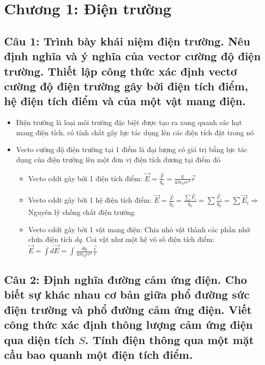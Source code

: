 \section[Chương 1]{Chương 1: Điện trường}

\subsection[Câu 1]{Câu 1: Trình bày khái niệm điện trường. Nêu định nghĩa và ý nghĩa của vector cường độ điện trường. Thiết lập công thức xác định vectơ cường độ điện trường gây bởi điện tích điểm, hệ điện tích điểm và của một vật mang điện.}

\begin{itemize}
  \item Điện trường là loại môi trường đặc biệt được tạo ra xung quanh các hạt mang điện tích, có tính chất gây lực tác dụng lên các điện tích đặt trong nó
  \item Vecto cường độ điện trường tại 1 điểm là đại lượng có giá trị bằng lực tác dụng của điện trường lên một đơn vị điện tích dương tại điểm đó
  \begin{itemize}
    \item Vecto cddt gây bởi 1 điện tích điểm: $\vec{E} = \frac{\vec{F}}{q_0} = \frac{q}{4\pi\epsilon_0\epsilon r^3} \vec{r}$
    \item Vecto cddt gây bởi 1 hệ điện tích điểm: $\vec{E} = \frac{\vec{F}}{q_0} = \frac{\sum\limits \vec{F}_i}{q_0} = \sum\limits \frac{\vec{F}_i}{q_0} = \sum\limits \vec{E}_i \Rightarrow$  Nguyên lý chồng chất điện trường
    \item Vecto cddt gây bởi 1 vật mang điện: Chia nhỏ vật thành các phần nhở chứa điện tích $dq$. Coi vật như một hệ vô số điện tích điểm: $\vec{E} = \int d\vec{E} = \int \frac{dq}{4\pi\epsilon_0\epsilon r^2} \frac{\vec{r}}{r}$
  \end{itemize}
\end{itemize}

\subsection[Câu 2]{Câu 2: Định nghĩa đường cảm ứng điện. Cho biết sự khác nhau cơ bản giữa phổ đường sức điện trường và phổ đường cảm ứng điện. Viết công thức xác định thông lượng cảm ứng điện qua diện tích $S$. Tính điện thông qua một mặt cầu bao quanh một điện tích điểm.} 


